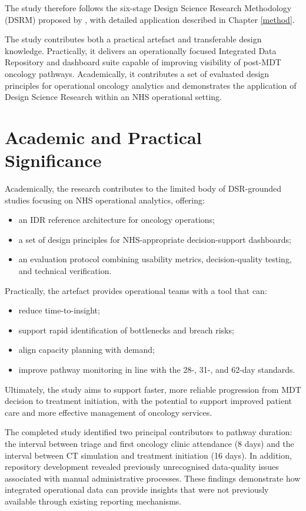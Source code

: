 The study therefore follows the six-stage Design Science Research Methodology (DSRM) proposed by \cite{peffers2007}, with detailed application described in Chapter \ref{method}.

The study contributes both a practical artefact and transferable design knowledge. Practically, it delivers an operationally focused Integrated Data Repository and dashboard suite capable of improving visibility of post-MDT oncology pathways. Academically, it contributes a set of evaluated design principles for operational oncology analytics and demonstrates the application of Design Science Research within an NHS operational setting.  

\section{Academic and Practical Significance}

Academically, the research contributes to the limited body of DSR-grounded studies focusing on NHS operational analytics, offering:
\begin{itemize}
    \item an IDR reference architecture for oncology operations;
    \item a set of design principles for NHS-appropriate decision-support dashboards;
    \item an evaluation protocol combining usability metrics, decision-quality testing, and technical verification.
\end{itemize}

Practically, the artefact provides operational teams with a tool that can:
\begin{itemize}
    \item reduce time-to-insight;
    \item support rapid identification of bottlenecks and breach risks;
    \item align capacity planning with demand;
    \item improve pathway monitoring in line with the 28-, 31-, and 62-day standards.
\end{itemize}

Ultimately, the study aims to support faster, more reliable progression from MDT decision to treatment initiation, with the potential to support improved patient care and more effective management of oncology services.

The completed study identified two principal contributors to pathway duration: the interval between triage and first oncology clinic attendance (8 days) and the interval between CT simulation and treatment initiation (16 days). In addition, repository development revealed previously unrecognised data-quality issues associated with manual administrative processes. These findings demonstrate how integrated operational data can provide insights that were not previously available through existing reporting mechanisms. 
